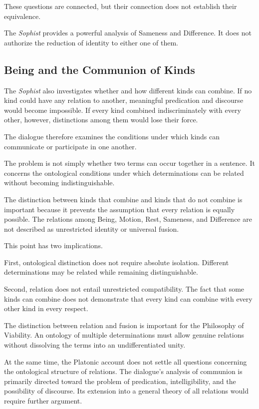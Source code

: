 These questions are connected, but their connection does not establish
their equivalence.

The \textit{Sophist} provides a powerful analysis of Sameness and
Difference. It does not authorize the reduction of identity to either
one of them.

\subsection{Being and the Communion of Kinds}

The \textit{Sophist} also investigates whether and how different kinds
can combine. If no kind could have any relation to another, meaningful
predication and discourse would become impossible. If every kind
combined indiscriminately with every other, however, distinctions among
them would lose their force.

The dialogue therefore examines the conditions under which kinds can
communicate or participate in one another.

The problem is not simply whether two terms can occur together in a
sentence. It concerns the ontological conditions under which
determinations can be related without becoming indistinguishable.

The distinction between kinds that combine and kinds that do not combine
is important because it prevents the assumption that every relation is
equally possible. The relations among Being, Motion, Rest, Sameness,
and Difference are not described as unrestricted identity or universal
fusion.

This point has two implications.

First, ontological distinction does not require absolute isolation.
Different determinations may be related while remaining distinguishable.

Second, relation does not entail unrestricted compatibility. The fact
that some kinds can combine does not demonstrate that every kind can
combine with every other kind in every respect.

The distinction between relation and fusion is important for the
Philosophy of Viability. An ontology of multiple determinations must
allow genuine relations without dissolving the terms into an
undifferentiated unity.

At the same time, the Platonic account does not settle all questions
concerning the ontological structure of relations. The dialogue's
analysis of communion is primarily directed toward the problem of
predication, intelligibility, and the possibility of discourse. Its
extension into a general theory of all relations would require further
argument.


